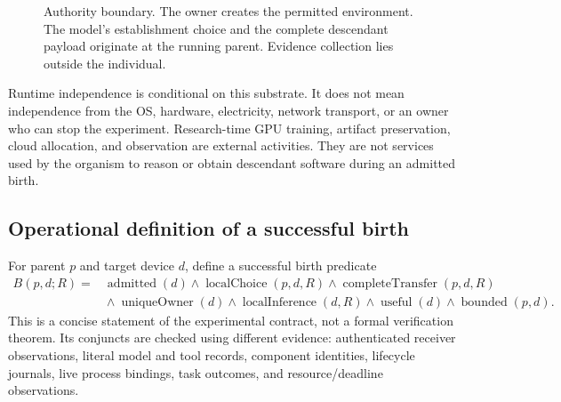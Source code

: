 \documentclass[11pt,letterpaper]{article}
\begin{document}
\begin{figure}[htbp]
\centering
{}
\caption{Authority boundary. The owner creates the permitted environment.
The model's establishment choice and the complete descendant payload originate
at the running parent. Evidence collection lies outside the individual.}
\label{fig:boundary}
\end{figure}

Runtime independence is conditional on this substrate. It does not mean
independence from the OS, hardware, electricity, network transport, or an owner
who can stop the experiment. Research-time GPU training, artifact preservation,
cloud allocation, and observation are external activities. They are not
services used by the organism to reason or obtain descendant software during
an admitted birth.

\subsection{Operational definition of a successful birth}

For parent $p$ and target device $d$, define a successful birth predicate
\begin{align}
B(p,d;R) ={}&
\operatorname{admitted}(d)
\land \operatorname{localChoice}(p,d,R)
\land \operatorname{completeTransfer}(p,d,R) \nonumber\\
&{}\land \operatorname{uniqueOwner}(d)
\land \operatorname{localInference}(d,R)
\land \operatorname{useful}(d)
\land \operatorname{bounded}(p,d).
\label{eq:birth}
\end{align}
This is a concise statement of the experimental contract, not a formal
verification theorem. Its conjuncts are checked using different evidence:
authenticated receiver observations, literal model and tool records, component
identities, lifecycle journals, live process bindings, task outcomes, and
resource/deadline observations.
\end{document}
